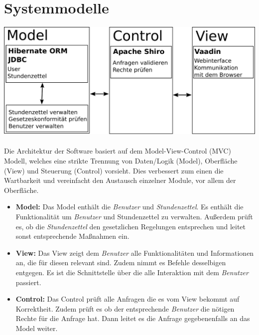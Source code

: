 \section{Systemmodelle}

\includegraphics[width=\linewidth]{mvc.pdf}\\
\\
Die Architektur der Software basiert auf dem Model-View-Control (MVC) Modell, welches eine strikte Trennung von Daten/Logik (Model), Oberfläche (View) und Steuerung (Control) vorsieht.
Dies verbessert zum einen die Wartbarkeit und vereinfacht den Austausch einzelner Module, vor allem der Oberfläche.
\begin{itemize}
	\item \textbf{Model:}
		Das Model enthält die \emph{Benutzer} und \emph{Stundenzettel}.
		Es enthält die Funktionalität um \emph{Benutzer} und Stundenzettel zu verwalten.
		Außerdem prüft es, ob die \emph{Stundenzettel} den gesetzlichen Regelungen entsprechen und leitet sonst entsprechende Maßnahmen ein.
	\item \textbf{View:}
		Das View zeigt dem \emph{Benutzer} alle Funktionalitäten und Informationen an, die für diesen relevant sind.
		Zudem nimmt es Befehle desselbigen entgegen.
		Es ist die Schnittstelle über die alle Interaktion mit dem \emph{Benutzer} passiert.
	\item \textbf{Control:}
		Das Control prüft alle Anfragen die es vom View bekommt auf Korrektheit.
		Zudem prüft es ob der entsprechende \emph{Benutzer} die nötigen Rechte für die Anfrage hat.
		Dann leitet es die Anfrage gegebenenfalls an das Model weiter.
\end{itemize}
